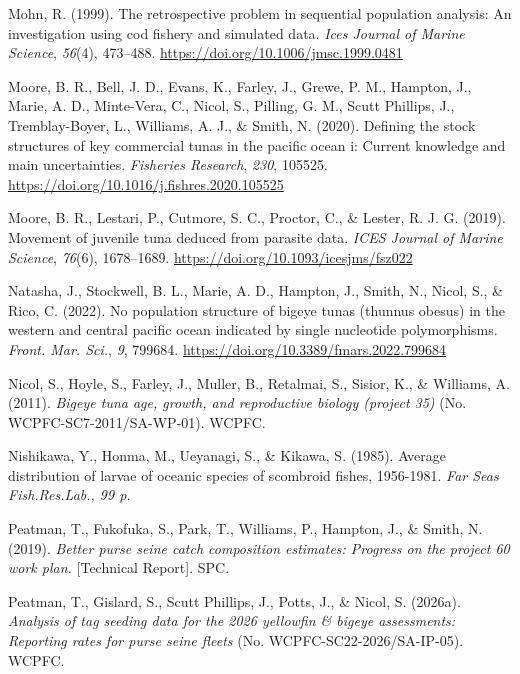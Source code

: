 \documentclass[
  english,
  a4paper,
  a4paper,
  11pt]{SCreport}
\newlength{\cslhangindent}
\newenvironment{CSLReferences}[2] %
 {\begin{list}{}{%
  \setlength{\itemindent}{0pt}
  \setlength{\leftmargin}{0pt}
  \setlength{\parsep}{0pt}
  \ifodd #1
   \setlength{\leftmargin}{\cslhangindent}
   \setlength{\itemindent}{-1\cslhangindent}
  \fi
  \setlength{\itemsep}{#2\baselineskip}}}
 {\end{list}}
\providecommand{\DIFaddend}{} %
\DeclareRobustCommand{\DIFaddend}{\DIFOaddend \let\includegraphics\DIFOincludegraphics} %
\begin{document}
\begin{CSLReferences}{1}{0}
\DIFaddend {}
Mohn, R. (1999). The retrospective problem in sequential population
analysis: An investigation using cod fishery and simulated data.
\emph{Ices Journal of Marine Science}, \emph{56}(4), 473--488.
\url{https://doi.org/10.1006/jmsc.1999.0481}

Moore, B. R., Bell, J. D., Evans, K., Farley, J., Grewe, P. M., Hampton,
J., Marie, A. D., Minte-Vera, C., Nicol, S., Pilling, G. M., Scutt
Phillips, J., Tremblay-Boyer, L., Williams, A. J., \& Smith, N. (2020).
Defining the stock structures of key commercial tunas in the pacific
ocean i: Current knowledge and main uncertainties. \emph{Fisheries
Research}, \emph{230}, 105525.
\url{https://doi.org/10.1016/j.fishres.2020.105525}

Moore, B. R., Lestari, P., Cutmore, S. C., Proctor, C., \& Lester, R. J.
G. (2019). Movement of juvenile tuna deduced from parasite data.
\emph{{ICES} Journal of Marine Science}, \emph{76}(6), 1678--1689.
\url{https://doi.org/10.1093/icesjms/fsz022}

Natasha, J., Stockwell, B. L., Marie, A. D., Hampton, J., Smith, N.,
Nicol, S., \& Rico, C. (2022). No population structure of bigeye tunas
(thunnus obesus) in the western and central pacific ocean indicated by
single nucleotide polymorphisms. \emph{Front. Mar. Sci.}, \emph{9},
799684. \url{https://doi.org/10.3389/fmars.2022.799684}

Nicol, S., Hoyle, S., Farley, J., Muller, B., Retalmai, S., Sisior, K.,
\& Williams, A. (2011). \emph{Bigeye tuna age, growth, and reproductive
biology (project 35)} (No. {WCPFC}-{SC}7-2011/{SA}-{WP}-01). WCPFC.

Nishikawa, Y., Honma, M., Ueyanagi, S., \& Kikawa, S. (1985). Average
distribution of larvae of oceanic species of scombroid fishes,
1956-1981. \emph{Far Seas Fish.Res.Lab., 99 p.}

Peatman, T., Fukofuka, S., Park, T., Williams, P., Hampton, J., \&
Smith, N. (2019). \emph{Better purse seine catch composition estimates:
Progress on the project 60 work plan.} {[}Technical Report{]}. SPC.

Peatman, T., Gislard, S., Scutt Phillips, J., Potts, J., \& Nicol, S.
(2026a). \emph{Analysis of tag seeding data for the 2026 yellowfin \&
bigeye assessments: Reporting rates for purse seine fleets} (No.
{WCPFC}-{SC}22-2026/{SA}-{IP}-05). WCPFC.


\end{CSLReferences}
\end{document}
